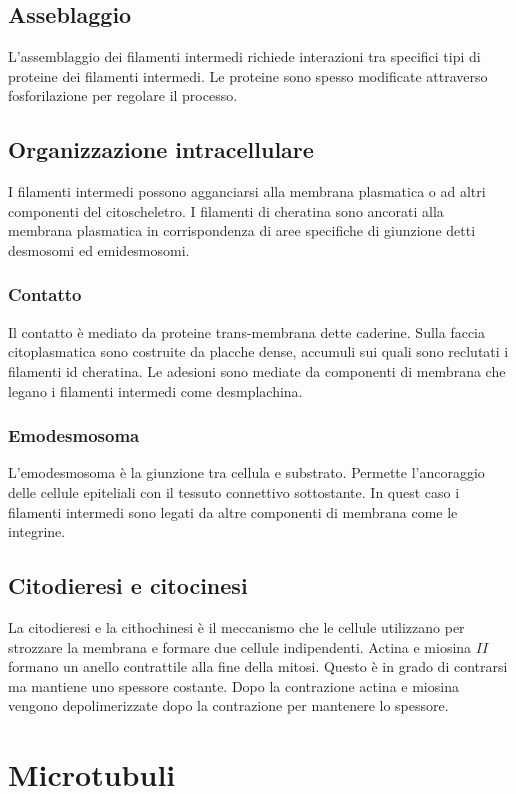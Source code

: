 	\subsection{Asseblaggio}
	L'assemblaggio dei filamenti intermedi richiede interazioni tra specifici tipi di proteine dei filamenti intermedi.
	Le proteine sono spesso modificate attraverso fosforilazione per regolare il processo.

	\subsection{Organizzazione intracellulare}
	I filamenti intermedi possono agganciarsi alla membrana plasmatica o ad altri componenti del  citoscheletro.
	I filamenti di cheratina sono ancorati alla membrana plasmatica in corrispondenza di aree specifiche di giunzione detti desmosomi ed emidesmosomi.

		\subsubsection{Contatto}
		Il contatto \`e mediato da proteine trans-membrana dette caderine.
		Sulla faccia citoplasmatica sono costruite da placche dense, accumuli sui quali sono reclutati i filamenti id cheratina.
		Le adesioni sono mediate da componenti di membrana che legano i filamenti intermedi come desmplachina.

		\subsubsection{Emodesmosoma}
		L'emodesmosoma \`e la giunzione tra cellula e substrato.
		Permette l'ancoraggio delle cellule epiteliali con il tessuto connettivo sottostante.
		In quest caso i filamenti intermedi sono legati da altre componenti di membrana come le integrine.

	\subsection{Citodieresi e citocinesi}
	La citodieresi e la cithochinesi \`e il meccanismo che le cellule utilizzano per strozzare la membrana e formare due cellule indipendenti.
	Actina e miosina $II$ formano un anello contrattile alla fine della mitosi.
	Questo \`e in grado di contrarsi ma mantiene uno spessore costante.
	Dopo la contrazione actina e miosina vengono depolimerizzate dopo la contrazione per mantenere lo spessore.

\section{Microtubuli}

